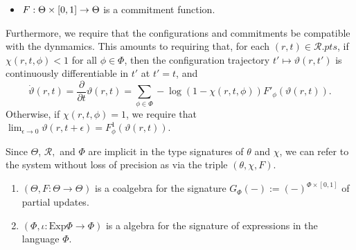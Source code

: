 \documentclass{article}
\newcommand\pts[1]{#1.\mathit{pts}}
\newcommand\R{\mathcal R}
\begin{document}
\begin{defn}
\begin{itemize}[]
        \item $F : \Theta \time \Phi \times [0,1] \to \Theta$ is a commitment function.
    \end{itemize}
    Furthermore, we require that the configurations and commitments be compatible with the dynmamics.
    This amounts to requiring that,
    for each $(r,t) \in \pts \R$,
        if $\chi(r,t,\phi) < 1$ for all $\phi \in \Phi$, then
    the configuration trajectory $t' \mapsto \vartheta(r,t')$ is continuously differentiable in $t'$ at $t'=t$, and
    \[
        \dot\vartheta(r,t) = \frac{\partial}{\partial t} \vartheta(r, t) =
            \sum_{\phi \in \Phi} -\log (1 - \chi(r,t,\phi)) F'_\phi(\vartheta(r,t)).
    \]
    Otherwise, if $\chi(r,t,\phi) = 1$, we require that
    $\displaystyle
        \lim_{\epsilon \to 0} \vartheta(r,t+\epsilon) =
            F^1_\phi(\vartheta(r,t))
    $.

    Since $\Theta$, $\R,$ and $\Phi$ are implicit in the type signatures of $\theta$ and $\chi$, we can refer to the system without loss of precision as via the triple $(\theta, \chi, F)$.
\end{defn}

\begin{remark}
    \begin{enumerate}
        \item
        $(\Theta, F: \Theta \to \Theta^{})$ is a coalgebra for the signature $G_\Phi(-) := (-)^{\Phi \times [0,1]}$ of partial updates.
        \item $(\Phi, \iota : \mathrm{Exp} \Phi \to \Phi)$ is a algebra for the signature of expressions in the language $\Phi$.
    \end{enumerate}
\end{remark}
\end{document}
